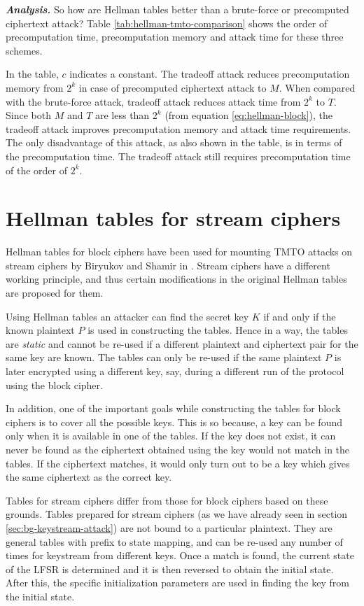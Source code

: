 \noindent \textit{\textbf{Analysis.}} So how are Hellman tables better than a brute-force or precomputed ciphertext attack? Table \ref{tab:hellman-tmto-comparison} shows the order of precomputation time, precomputation memory and attack time for these three schemes. 

In the table, $c$ indicates a constant. The tradeoff attack reduces precomputation memory from $2^k$ in case of precomputed ciphertext attack to $M$. When compared with the brute-force attack, tradeoff attack reduces attack time from $2^k$ to $T$. Since both $M$ and $T$ are less than $2^k$ (from equation \ref{eq:hellman-block}), the tradeoff attack improves precomputation memory and attack time requirements. The only disadvantage of this attack, as also shown in the \mbox{table}, is in terms of the precomputation time. The tradeoff attack still requires precomputation time of the order of $2^k$.

\section{Hellman tables for stream ciphers}

Hellman tables for block ciphers have been used for mounting TMTO attacks on stream ciphers by Biryukov and Shamir in \cite{biryukov2000ctm}. Stream ciphers have a different working principle, and thus certain modifications in the original Hellman tables are proposed for them. 

Using Hellman tables an attacker can find the secret key $K$ if and only if the known plaintext $P$ is used in constructing the tables. Hence in a way, the tables are \emph{static} and cannot be re-used if a different plaintext and ciphertext pair for the same key are known. The tables can only be re-used if the same plaintext $P$ is later encrypted using a different key, say, during a different run of the protocol using the block cipher.

In addition, one of the important goals while constructing the tables for block ciphers is to cover all the possible keys. This is so because, a key can be found only when it is available in one of the tables. If the key does not exist, it can never be found as the ciphertext obtained using the key would not match in the tables. If the ciphertext matches, it would only turn out to be a key which gives the same ciphertext as the correct key. 

Tables for stream ciphers differ from those for block ciphers based on these grounds. Tables prepared for stream ciphers (as we have already seen in section \ref{sec:bg-keystream-attack}) are not bound to a particular plaintext. They are general tables with prefix to state mapping, and can be re-used any number of times for keystream from different keys. Once a match is found, the current state of the LFSR is determined and it is then reversed to obtain the initial state. After this, the specific initialization parameters are used in finding the key from the initial state.

